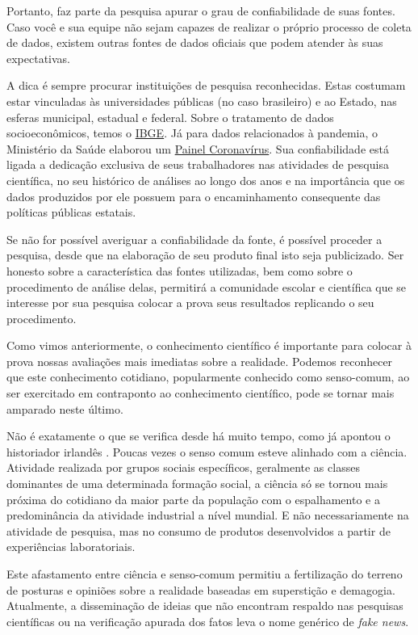Portanto, faz parte da pesquisa apurar o grau de confiabilidade de suas fontes. Caso você e sua equipe não sejam capazes de realizar o próprio processo de coleta de dados, existem outras fontes de dados oficiais que podem atender às suas expectativas.

A dica é sempre procurar instituições de pesquisa reconhecidas. Estas costumam estar vinculadas às universidades públicas (no caso brasileiro) e ao Estado, nas esferas municipal, estadual e federal. Sobre o tratamento de dados socioeconômicos, temos o  \href{https://www.ibge.gov.br/}{IBGE}. Já para dados relacionados à pandemia, o Ministério da Saúde elaborou um \href{https://covid.saude.gov.br/}{Painel Coronavírus}. Sua confiabilidade está ligada a dedicação exclusiva de seus trabalhadores nas atividades de pesquisa científica, no seu histórico de análises ao longo dos anos e na importância que os dados produzidos por ele possuem para o encaminhamento consequente das políticas públicas estatais.

Se não for possível averiguar a confiabilidade da fonte, é possível proceder a pesquisa, desde que na elaboração de seu produto final isto seja publicizado. Ser honesto sobre a característica das fontes utilizadas, bem como sobre o procedimento de análise delas, permitirá a comunidade escolar e científica que se interesse por sua pesquisa colocar a prova seus resultados replicando o seu procedimento.


Como vimos anteriormente, o conhecimento científico é importante para colocar à prova nossas avaliações mais imediatas sobre a realidade. Podemos reconhecer que este conhecimento cotidiano, popularmente conhecido como senso-comum, ao ser exercitado em contraponto ao conhecimento científico, pode se tornar mais amparado neste último.

Não é exatamente o que se verifica desde há muito tempo, como já apontou o historiador irlandês \cite{bernal1975}. Poucas vezes o senso comum esteve alinhado com a ciência. Atividade realizada por grupos sociais específicos, geralmente as classes dominantes de uma determinada formação social, a ciência só se tornou mais próxima do cotidiano da maior parte da população com o espalhamento e a predominância da atividade industrial a nível mundial. E não necessariamente na atividade de pesquisa, mas no consumo de produtos desenvolvidos a partir de experiências laboratoriais.

Este afastamento entre ciência e senso-comum permitiu a fertilização do terreno de posturas e opiniões sobre a realidade baseadas em superstição e demagogia. Atualmente, a disseminação de ideias que não encontram respaldo nas pesquisas científicas ou na verificação apurada dos fatos leva o nome genérico de \textit{fake news}.

